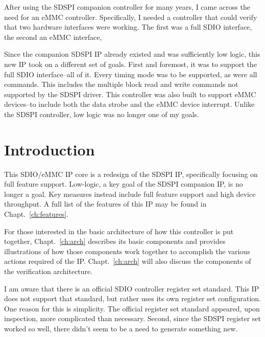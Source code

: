 \documentclass{gqtekspec}
\begin{document}
\begin{preface}
After using the SDSPI companion controller for many years, I came across the
need for an eMMC controller.  Specifically, I needed a controller that could
verify that two hardware interfaces were working.  The first was a full SDIO
interface, the second an eMMC interface,

Since the companion SDSPI IP already existed and was sufficiently low logic,
this new IP took on a different set of goals.  First and foremost, it was to
support the full SDIO interface--all of it.  Every timing mode was to be
supported, as were all commands.  This includes the multiple block read and
write commands not supported by the SDSPI driver.  This controller was also
built to support eMMC devices--to include both the data strobe and the eMMC
device interrupt.  Unlike the SDSPI controller, low logic was no longer one
of my goals.
\end{preface}

\chapter{Introduction}
\setcounter{page}{1}

This SDIO/eMMC IP core is a redesign of the SDSPI IP, specifically focusing on
full feature support.  Low-logic, a key goal of the SDSPI companion IP, is no
longer a goal.  Key measures instead include full feature support and high
device throughput.  A full list of the features of this IP may be found in
Chapt.~\ref{ch:features}.

For those interested in the basic architecture of how this controller is put
together, Chapt.~\ref{ch:arch} describes its basic components and provides
illustrations of how those components work together to accomplish the various
actions required of the IP.  Chapt.~\ref{ch:arch} will also discuss the
components of the verification architecture.

I am aware that there is an official SDIO controller register set standard.
This IP does not support that standard, but rather uses its own register set
configuration.  One reason for this is simplicity.  The official register set
standard appeared, upon inspection, more complicated than necessary.  Second,
since the SDSPI register set worked so well, there didn't seem to be a need to
generate something new.
\end{document}
